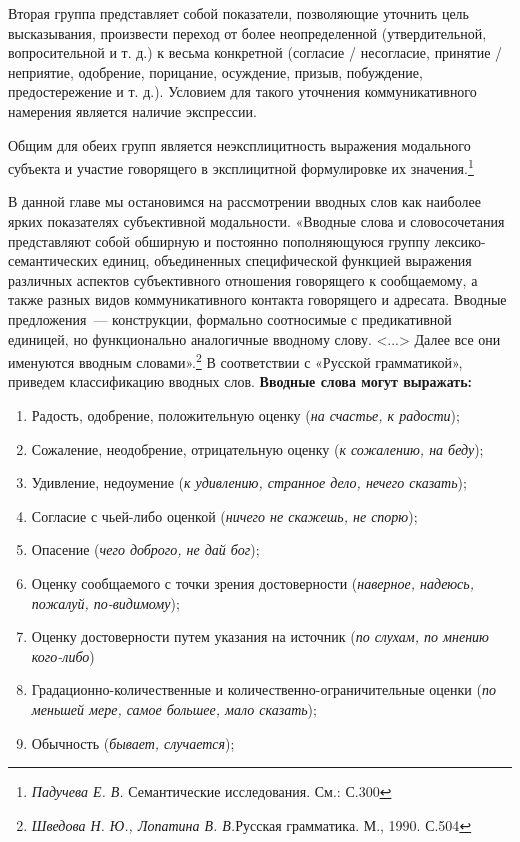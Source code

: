 \documentclass{kursa4}
\begin{document}
      Вторая группа представляет собой показатели, позволяющие уточнить цель высказывания, произвести переход от более неопределенной (утвердительной, вопросительной и т. д.) к весьма конкретной (согласие / несогласие, принятие / неприятие, одобрение, порицание, осуждение, призыв, побуждение, предостережение и т. д.). Условием для такого уточнения коммуникативного намерения является наличие экспрессии. 

      Общим для обеих групп является неэксплицитность выражения модального субъекта и участие говорящего в эксплицитной формулировке их значения.\footnote{\textit{Падучева Е. В. }Семантические исследования. См.: С.300}

      В данной главе мы остановимся на рассмотрении вводных слов как наиболее ярких показателях субъективной модальности. «Вводные слова и словосочетания представляют собой обширную и постоянно пополняющуюся группу лексико-семантических единиц, объединенных специфической функцией выражения различных аспектов субъективного отношения говорящего к сообщаемому, а также разных видов коммуникативного контакта говорящего и адресата. Вводные предложения~--- конструкции, формально соотносимые с предикативной единицей, но функционально аналогичные вводному слову. \textless{}...\textgreater{}
      Далее все они именуются вводным словами».\footnote{\textit{Шведова Н. Ю., Лопатина В. В.}{Русская грамматика. М., 1990. С.504}}\newline
      В соответствии с «Русской грамматикой», приведем классификацию вводных слов. \textbf{Вводные слова могут выражать:}
      \begin{enumerate}
        \item Радость, одобрение, положительную оценку (\textit{на счастье, к радости}); \item Сожаление, неодобрение, отрицательную оценку (\textit{к сожалению, на беду}); \item Удивление, недоумение (\textit{к удивлению, странное дело, нечего сказать}); \item Согласие с чьей-либо оценкой (\textit{ничего не скажешь, не спорю}); \item Опасение (\textit{чего доброго, не дай бог}); \item Оценку сообщаемого с точки зрения достоверности (\textit{наверное, надеюсь, пожалуй, по-видимому}); \item Оценку достоверности путем указания на источник (\textit{по слухам, по мнению кого-либо}) \item Градационно-количественные и количественно-ограничительные оценки (\textit{по меньшей мере, самое большее, мало сказать}); \item Обычность (\textit{бывает, случается}); \end{enumerate}
\end{document}
